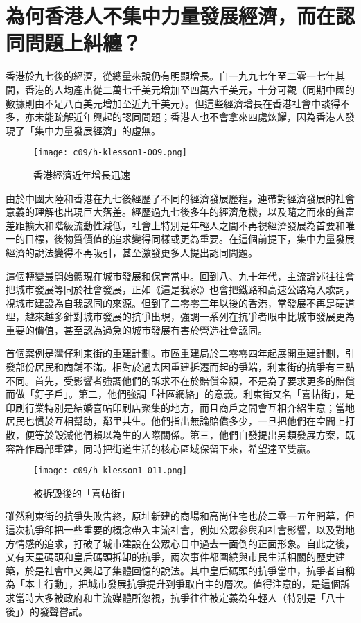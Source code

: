 \section{為何香港人不集中力量發展經濟，而在認同問題上糾纏？}

香港於九七後的經濟，從總量來說仍有明顯增長。自一九九七年至二零一七年其間，香港的人均產出從二萬七千美元增加至四萬六千美元，十分可觀（同期中國的數據則由不足八百美元增加至近九千美元）。但這些經濟增長在香港社會中談得不多，亦未能疏解近年興起的認同問題；香港人也不會拿來四處炫耀，因為香港人發現了「集中力量發展經濟」的虛無。

\begin{figure}[htbp]
    \centering
    \texttt{[image: c09/h-klesson1-009.png]}
    \caption{香港經濟近年增長迅速} 
\end{figure}

由於中國大陸和香港在九七後經歷了不同的經濟發展歷程，連帶對經濟發展的社會意義的理解也出現巨大落差。經歷過九七後多年的經濟危機，以及隨之而來的貧富差距擴大和階級流動性減低，社會上特別是年輕人之間不再視經濟發展為首要和唯一的目標，後物質價值的追求變得同樣或更為重要。在這個前提下，集中力量發展經濟的說法變得不再吸引，甚至激發更多人提出認同問題。

這個轉變最開始體現在城市發展和保育當中。回到八、九十年代，主流論述往往會把城市發展等同於社會發展，正如《這是我家》也會把鐵路和高速公路寫入歌詞，視城市建設為自我認同的來源。但到了二零零三年以後的香港，當發展不再是硬道理，越來越多針對城市發展的抗爭出現，強調一系列在抗爭者眼中比城市發展更為重要的價值，甚至認為過急的城市發展有害於營造社會認同。

首個案例是灣仔利東街的重建計劃。市區重建局於二零零四年起展開重建計劃，引發部份居民和商鋪不滿。相對於過去因重建拆遷而起的爭端，利東街的抗爭有三點不同。首先，受影響者強調他們的訴求不在於賠償金額，不是為了要求更多的賠償而做「釘子戶」。第二，他們強調「社區網絡」的意義。利東街又名「喜帖街」，是印刷行業特別是結婚喜帖印刷店聚集的地方，而且商戶之間會互相介紹生意；當地居民也慣於互相幫助，鄰里共生。他們指出無論賠償多少，一旦把他們在空間上打散，便等於毀滅他們賴以為生的人際關係。第三，他們自發提出另類發展方案，既容許作局部重建，同時把街道生活的核心區域保留下來，希望達至雙贏。

\begin{figure}[htbp]
    \centering
    \texttt{[image: c09/h-klesson1-011.png]}
    \caption{被拆毀後的「喜帖街」} 
\end{figure}

雖然利東街的抗爭失敗告終，原址新建的商場和高尚住宅也於二零一五年開幕，但這次抗爭卻把一些重要的概念帶入主流社會，例如公眾參與和社會影響，以及對地方情感的追求，打破了城市建設在公眾心目中過去一面倒的正面形象。自此之後，又有天星碼頭和皇后碼頭拆卸的抗爭，兩次事件都圍繞與市民生活相關的歷史建築，於是社會中又興起了集體回憶的說法。其中皇后碼頭的抗爭當中，抗爭者自稱為「本土行動」，把城市發展抗爭提升到爭取自主的層次。值得注意的，是這個訴求當時大多被政府和主流媒體所忽視，抗爭往往被定義為年輕人（特別是「八十後」）的發聲嘗試。

